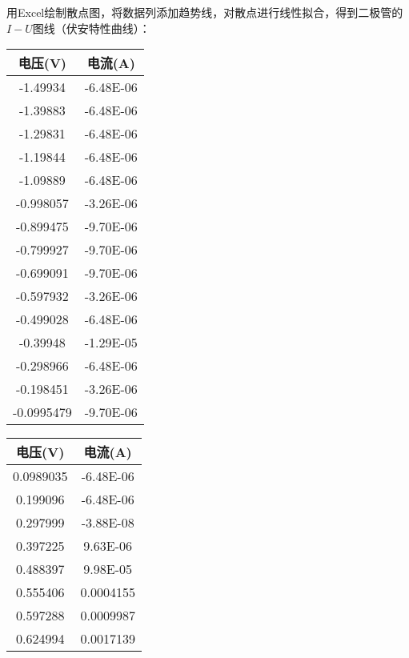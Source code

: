\documentclass[12pt]{article}
\begin{document}
用Excel绘制散点图，将数据列添加趋势线，对散点进行线性拟合，得到二极管的$I-U$图线（伏安特性曲线）：

\begin{table}[htbp]
    \centering
    \begin{tabular}{|c|c|}
        \hline
        电压(V) & 电流(A) \\
        \hline
        -1.49934 & -6.48E-06 \\
        \hline
        -1.39883 & -6.48E-06 \\
        \hline
        -1.29831 & -6.48E-06 \\
        \hline
        -1.19844 & -6.48E-06 \\
        \hline
        -1.09889 & -6.48E-06 \\
        \hline
        -0.998057 & -3.26E-06 \\
        \hline
        -0.899475 & -9.70E-06 \\
        \hline
        -0.799927 & -9.70E-06 \\
        \hline
        -0.699091 & -9.70E-06 \\
        \hline
        -0.597932 & -3.26E-06 \\
        \hline
        -0.499028 & -6.48E-06 \\
        \hline
        -0.39948 & -1.29E-05 \\
        \hline
        -0.298966 & -6.48E-06 \\
        \hline
        -0.198451 & -3.26E-06 \\
        \hline
        -0.0995479 & -9.70E-06 \\
        \hline
    \end{tabular}%
    \qquad
    \begin{tabular}{|c|c|}
        \hline
        电压(V) & 电流(A) \\
        \hline
        0.0989035 & -6.48E-06 \\
        \hline
        0.199096 & -6.48E-06 \\
        \hline
        0.297999 & -3.88E-08 \\
        \hline
        0.397225 & 9.63E-06 \\
        \hline
        0.488397 & 9.98E-05 \\
        \hline
        0.555406 & 0.0004155 \\
        \hline
        0.597288 & 0.0009987 \\
        \hline
        0.624994 & 0.0017139 \\

\end{tabular}
\end{table}
\end{document}

